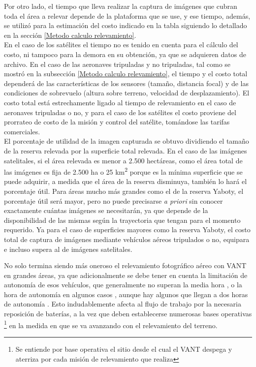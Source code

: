 Por otro lado, el tiempo que lleva realizar la captura de imágenes que cubran toda el área a relevar depende de la plataforma que se use, y ese tiempo, además, se utilizó para la estimación del costo indicado en la tabla siguiendo lo detallado en la sección \ref{Metodo calculo relevamiento}. \\
En el caso de los satélites el tiempo no es tenido en cuenta para el cálculo del costo, ni tampoco para la demora en su obtención, ya que se adquieren datos de archivo. En el caso de las aeronaves tripuladas y no tripuladas, tal como se mostró en la subsección \ref{Metodo calculo relevamiento}, el tiempo y el costo total dependerá de las características de los sensores (tamaño, distancia focal) y de las condiciones de sobrevuelo (altura sobre terreno, velocidad de desplazamiento). El costo total está estrechamente ligado al tiempo de relevamiento en el caso de aeronaves tripuladas o no, y para el caso de los satélites el costo proviene del prorrateo de costo de la misión y control del satélite, tomándose las tarifas comerciales.\\
El porcentaje de utilidad de la imagen capturada se obtuvo dividiendo el tamaño de la reserva relevada por la superficie total relevada. En el caso de las imágenes satelitales, si el área relevada es menor a 2.500 hectáreas, como el área total de las imágenes es fija de 2.500 ha o 25 km\textsuperscript{2} porque es la mínima superficie que se puede adquirir, a medida que el área de la reserva disminuya, también lo hará el porcentaje útil. Para áreas mucho más grandes como el de la reserva Yaboty, el porcentaje útil será mayor, pero no puede precisarse \textit{a priori} sin conocer exactamente cuántas imágenes se necesitarán, ya que depende de la disponibilidad de las mismas según la trayectoria que tengan para el momento requerido. Ya para el caso de superficies mayores como la reserva Yaboty, el costo total de captura de imágenes mediante vehículos aéreos tripulados o no, equipara e incluso supera al de imágenes satelitales. 

No solo termina siendo más oneroso el relevamiento fotográfico aéreo con VANT en grandes áreas, ya que adicionalmente se debe tener en cuenta la limitación de autonomía de esos vehículos, que generalmente no superan la media hora \cite{noauthor_dji_nodate}, o la hora de autonomía en algunos casos \cite{noauthor_specs_nodate}, aunque hay algunos que llegan a dos horas de autonomía \cite{noauthor_us-1_nodate}. Esto indudablemente afecta al flujo de trabajo por la necesaria reposición de baterías, a la vez que deben establecerse numerosas bases operativas \footnote{Se entiende por base operativa el sitio desde el cual el VANT despega y aterriza por cada misión de relevamiento que realiza} en la medida en que se va avanzando con el relevamiento del terreno.


